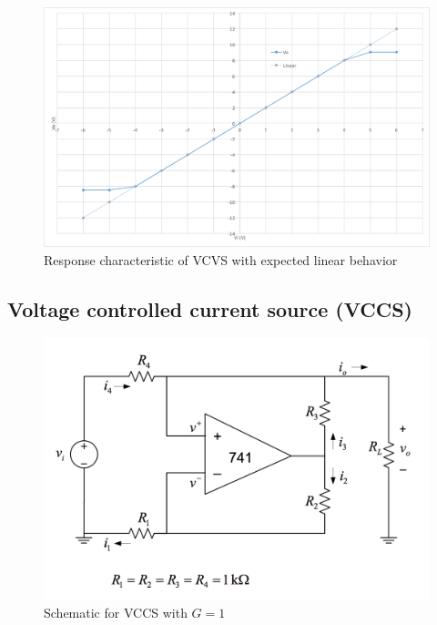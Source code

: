 \begin{figure}[tbph]
	\centering
	\includegraphics[width=0.95\linewidth]{graphics/vcvs-graph}
	\caption{Response characteristic of VCVS with expected linear behavior}
	\label{fig:vcvs-graph}
\end{figure}

\subsection{Voltage controlled current source (VCCS)}\label{sec:vccs}

\begin{figure}[tbph]
	\centering
	\includegraphics[width=0.7\linewidth]{graphics/vccs-schematic}
	\caption{Schematic for VCCS with $G = 1$}
	\label{fig:vccs-schematic}
\end{figure}


